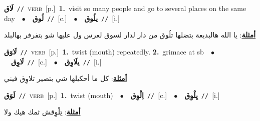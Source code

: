 \documentclass[10pt,a4paper,twoside]{article} %
\begin{document}
\begin{multicols}{2}
{\setlength\topsep{0pt}\textbf{\foreignlanguage{arabic}{لَاق}}\ {\color{gray}\texttt{//}\color{black}}\ \textsc{verb}\ [p.]\ \textbf{1.}~visit so many people and go to several places on the same day\ \ $\bullet$\ \ \setlength\topsep{0pt}\textbf{\foreignlanguage{arabic}{لُوق}}\ {\color{gray}\texttt{//}\color{black}}\ [c.]\ \ $\bullet$\ \ \setlength\topsep{0pt}\textbf{\foreignlanguage{arabic}{يلُوق}}\ {\color{gray}\texttt{//}\color{black}}\ [i.]\  \begin{flushright}\color{gray}\foreignlanguage{arabic}{\textbf{\underline{\foreignlanguage{arabic}{أمثلة}}}: يا الله هالبديعة بتضلها تلُوق من دار لدار لسوق لعرس ول عليها شو بتفرفر بهالبلد}\end{flushright}\color{black}} \vspace{2mm}

{\setlength\topsep{0pt}\textbf{\foreignlanguage{arabic}{لَاوَق}}\ {\color{gray}\texttt{//}\color{black}}\ \textsc{verb}\ [p.]\ \textbf{1.}~twist (mouth) repeatedly.  \textbf{2.}~grimace at sb\ \ $\bullet$\ \ \setlength\topsep{0pt}\textbf{\foreignlanguage{arabic}{لَاوِق}}\ {\color{gray}\texttt{//}\color{black}}\ [c.]\ \ $\bullet$\ \ \setlength\topsep{0pt}\textbf{\foreignlanguage{arabic}{يلَاوِق}}\ {\color{gray}\texttt{//}\color{black}}\ [i.]\  \begin{flushright}\color{gray}\foreignlanguage{arabic}{\textbf{\underline{\foreignlanguage{arabic}{أمثلة}}}: كل ما أحكيلها شي بتصير تلاوِق فيني}\end{flushright}\color{black}} \vspace{2mm}

{\setlength\topsep{0pt}\textbf{\foreignlanguage{arabic}{لَوَق}}\ {\color{gray}\texttt{//}\color{black}}\ \textsc{verb}\ [p.]\ \textbf{1.}~twist (mouth)\ \ $\bullet$\ \ \setlength\topsep{0pt}\textbf{\foreignlanguage{arabic}{اِلْوِق}}\ {\color{gray}\texttt{//}\color{black}}\ [c.]\ \ $\bullet$\ \ \setlength\topsep{0pt}\textbf{\foreignlanguage{arabic}{يِلْوِق}}\ {\color{gray}\texttt{//}\color{black}}\ [i.]\  \begin{flushright}\color{gray}\foreignlanguage{arabic}{\textbf{\underline{\foreignlanguage{arabic}{أمثلة}}}: تِلْوِقش ثمك هيك ولا}\end{flushright}\color{black}} \vspace{2mm}


\end{multicols}
\end{document}
